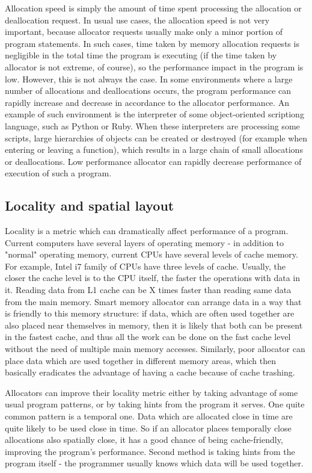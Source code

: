 Allocation speed is simply the amount of time spent processing the allocation or deallocation request. In usual use cases, the allocation speed is not very important, because allocator requests usually make only a minor portion of program statements. In such cases, time taken by memory allocation requests is negligible in the total time the program is executing (if the time taken by allocator is not extreme, of course), so the performance impact in the program is low. However, this is not always the case. In some environments where a large number of allocations and deallocations occurs, the program performance can rapidly increase and decrease in accordance to the allocator performance. An example of such environment is the interpreter of some object-oriented scriptiong language, such as Python or Ruby. When these interpreters are processing some scripts, large hierarchies of objects can be created or destroyed (for example when entering or leaving a function), which results in a large chain of small allocations or deallocations. Low performance allocator can rapidly decrease performance of execution of such a program.

\subsection{Locality and spatial layout}

Locality is a metric which can dramatically affect performance of a program. Current computers have several layers of operating memory - in addition to "normal" operating memory, current CPUs have several levels of cache memory. For example, Intel i7 family of CPUs have three levels of cache. Usually, the closer the cache level is to the CPU itself, the faster the operations with data in it. Reading data from L1 cache can be X times\cite{drepper-memory} faster than reading same data from the main memory. Smart memory allocator can arrange data in a way that is friendly to this memory structure: if data, which are often used together are also placed near themselves in memory, then it is likely that both can be present in the fastest cache, and thus all the work can be done on the fast cache level without the need of multiple main memory accesses. Similarly, poor allocator can place data which are used together in different memory areas, which then basically eradicates the advantage of having a cache because of cache trashing.

Allocators can improve their locality metric either by taking advantage of some usual program patterns, or by taking hints from the program it serves. One quite common pattern is a temporal one. Data which are allocated close in time are quite likely to be used close in time. So if an allocator places temporally close allocations also spatially close, it has a good chance of being cache-friendly, improving the program's performance. Second method is taking hints from the program itself - the programmer usually knows which data will be used together.

